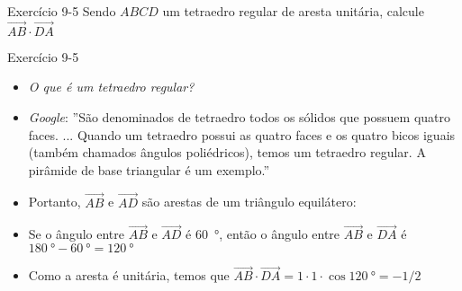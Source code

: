 \begin{frame}[c]{Exercício 9-5}
Sendo \(ABCD\) um tetraedro regular de aresta unitária, calcule \(\vec{AB}\cdot\vec{DA}\)
\end{frame}
\begin{frame}{Exercício 9-5}

\begin{itemize}[<+->]
    \item \textit{O que é um tetraedro regular?}
    \item \textit{Google}:
    ''São denominados de tetraedro todos os sólidos que possuem quatro faces. ... Quando um tetraedro possui as quatro faces e os quatro bicos iguais (também chamados ângulos poliédricos), temos um tetraedro regular. A pirâmide de base triangular é um exemplo.''
    \item Portanto, \(\vec{AB}\) e \(\vec{AD}\) são arestas de um triângulo equilátero:
    \begin{center}
    \end{center}
    \item Se o ângulo entre \(\vec{AB}\) e \(\vec{AD}\) é \SI{60}{\degree}, então o ângulo entre \(\vec{AB}\) e \(\vec{DA}\) é
    \(\SI{180}{\degree}-\SI{60}{\degree}=\SI{120}{\degree}\)
    \item Como a aresta é unitária, temos que
    \(\vec{AB}\cdot\vec{DA}=1 \cdot 1 \cdot \cos{\SI{120}{\degree}}=-1/2\)
\end{itemize}

\end{frame}

